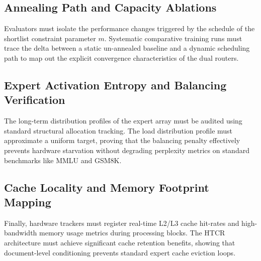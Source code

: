 \subsection{Annealing Path and Capacity Ablations}
Evaluators must isolate the performance changes triggered by the schedule of the shortlist constraint parameter $m$. Systematic comparative training runs must trace the delta between a static un-annealed baseline and a dynamic scheduling path to map out the explicit convergence characteristics of the dual routers.

\subsection{Expert Activation Entropy and Balancing Verification}
The long-term distribution profiles of the expert array must be audited using standard structural allocation tracking. The load distribution profile must approximate a uniform target, proving that the balancing penalty effectively prevents hardware starvation without degrading perplexity metrics on standard benchmarks like MMLU and GSM8K.

\subsection{Cache Locality and Memory Footprint Mapping}
Finally, hardware trackers must register real-time L2/L3 cache hit-rates and high-bandwidth memory usage metrics during processing blocks. The HTCR architecture must achieve significant cache retention benefits, showing that document-level conditioning prevents standard expert cache eviction loops.

% 
% 
